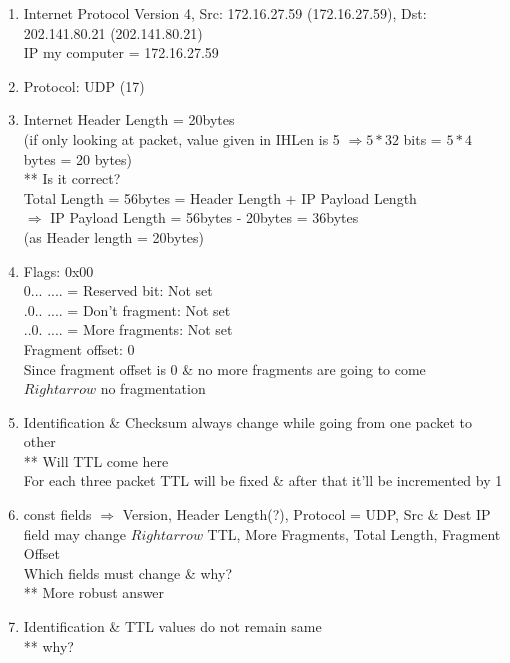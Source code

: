 \documentclass[a4,11pt]{article}
\begin{document}
  \begin{enumerate}
   \item Internet Protocol Version 4, Src: 172.16.27.59 (172.16.27.59), Dst: 202.141.80.21 (202.141.80.21) \\
	 IP my computer = 172.16.27.59

    \item Protocol: UDP (17)

    \item Internet Header Length = 20bytes \\
    (if only looking at packet, value given in IHLen is 5 $\Rightarrow 5*32$ bits = $5*4$bytes = 20 bytes) \\

    ** Is it correct? \\
    Total Length = 56bytes = Header Length + IP Payload Length \\
    $\Rightarrow$ IP Payload Length = 56bytes - 20bytes = 36bytes \\
    (as Header length = 20bytes)

    \item Flags: 0x00 \\
      0... .... = Reserved bit:   Not set \\
      .0.. .... = Don't fragment: Not set \\
      ..0. .... = More fragments: Not set \\
  Fragment offset: 0 \\
  Since fragment offset is 0 \& no more fragments are going to come \\
  $Rightarrow$ no fragmentation

  \item Identification \& Checksum always change while going from one packet to other \\
   ** Will TTL come here \\
  For each three packet TTL will be fixed \& after that it'll be incremented by 1

  \item const fields $\Rightarrow$ Version, Header Length(?), Protocol = UDP, Src \& Dest IP \\
	field may change $Rightarrow$ TTL, More Fragments, Total Length, Fragment Offset \\
	Which fields must change \& why? \\

    ** More robust answer

  \item Identification \& TTL values do not remain same\\
    ** why?

  \end{enumerate}
	  
\end{document}

